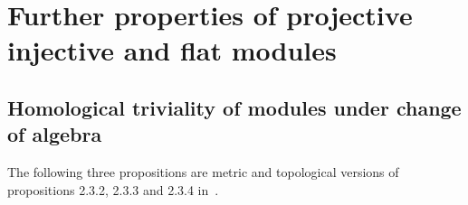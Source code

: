 
\section{
    Further properties of projective injective and flat modules
}\label{SectionFurtherPropertiesOfProjectiveInjectiveAndFlatModules}


\subsection{
    Homological triviality of modules under change of algebra
}\label{SubSectionHomologicalTrivialityOfModulesUnderChangeOfAlgebra}

The following three propositions are metric and topological versions of
propositions 2.3.2, 2.3.3 and 2.3.4 in~\cite{RamsHomPropSemgroupAlg}.


